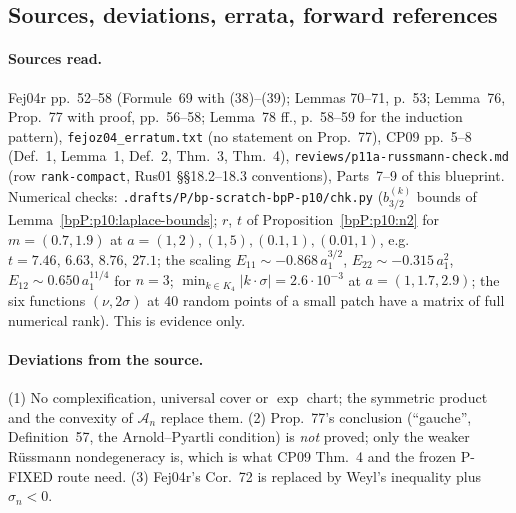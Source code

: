 \subsection{Sources, deviations, errata, forward references}\label{bpP:p10:notes}

\paragraph{Sources read.} Fej04r pp.~52--58 (Formule~69 with (38)--(39); Lemmas 70--71, p.~53; Lemma~76, Prop.~77 with proof, pp.~56--58; Lemma~78 ff., p.~58--59 for the induction pattern), \texttt{fejoz04\_erratum.txt} (no statement on Prop.~77), CP09 pp.~5--8 (Def.~1, Lemma~1, Def.~2, Thm.~3, Thm.~4), \texttt{reviews/p11a-russmann-check.md} (row \texttt{rank-compact}, Rus01 \S\S18.2--18.3 conventions), Parts~7--9 of this blueprint. Numerical checks: \texttt{.drafts/P/bp-scratch-bpP-p10/chk.py} ($b^{(k)}_{3/2}$ bounds of Lemma~\ref{bpP:p10:laplace-bounds}; $r$, $t$ of Proposition~\ref{bpP:p10:n2} for $m=(0.7,1.9)$ at $a=(1,2),(1,5),(0.1,1),(0.01,1)$, e.g.\ $t=7.46,\,6.63,\,8.76,\,27.1$; the scaling $E_{11}\sim-0.868\,a_1^{3/2}$, $E_{22}\sim-0.315\,a_1^2$, $E_{12}\sim0.650\,a_1^{11/4}$ for $n=3$; $\min_{k\in K_4}\lvert k\cdot\sigma\rvert=2.6\cdot10^{-3}$ at $a=(1,1.7,2.9)$; the six functions $(\nu,2\sigma)$ at 40 random points of a small patch have a matrix of full numerical rank). This is evidence only.

\paragraph{Deviations from the source.} (1) No complexification, universal cover or $\exp$ chart; the symmetric product and the convexity of $\mathcal A_n$ replace them. (2) Prop.~77's conclusion (``gauche'', Definition~57, the Arnold--Pyartli condition) is \emph{not} proved; only the weaker R\"ussmann nondegeneracy is, which is what CP09 Thm.~4 and the frozen P-FIXED route need. (3) Fej04r's Cor.~72 is replaced by Weyl's inequality plus $\sigma_n<0$.

